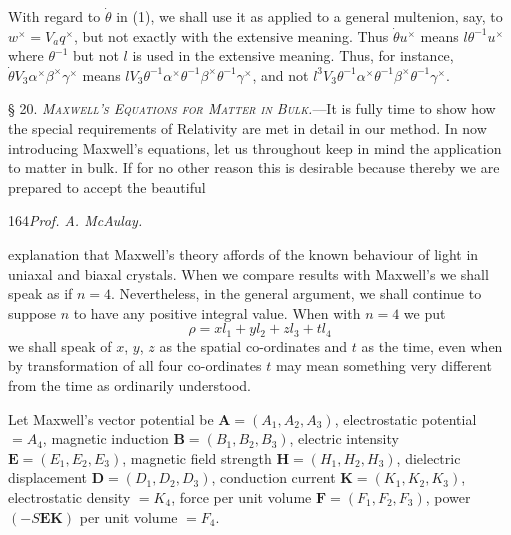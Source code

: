 \documentclass[11pt]{article}
\begin{document}
\indent With regard to $\dot\theta$ in (1), we shall use it as applied to a general multenion, say, to $w^\times=V_aq^\times$, but not exactly with the extensive meaning. Thus $\dot\theta u^\times$ means $l\theta^{-1}u^\times$ where $\theta^{-1}$ but not $l$ is used in the extensive meaning. Thus, for instance, $\dot\theta V_3\alpha^\times\beta^\times\gamma^\times$ means {\small$lV_3\theta^{-1}\alpha^\times\theta^{-1}\beta^\times\theta^{-1}\gamma^\times$}, and not {\small$l^3V_3\theta^{-1}\alpha^\times\theta^{-1}\beta^\times\theta^{-1}\gamma^\times$}.

\noindent\textsc{§ 20. \emph{Maxwell's Equations for Matter in Bulk.}}---It is fully time to show how the special requirements of Relativity are met in detail in our method. In now introducing Maxwell's equations, let us throughout keep in mind the application to matter in bulk. If for no other reason this is desirable because thereby we are prepared to accept the beautiful

\newpage\thispagestyle{empty}\begin{center}164\hfill \textit{Prof. A. McAulay.}\end{center}
explanation that Maxwell's theory affords of the known behaviour of light in uniaxal and biaxal crystals. When we compare results with Maxwell's we shall speak as if $n=4$. Nevertheless, in the general argument, we shall continue to suppose $n$ to have any positive integral value. When with $n=4$ we put
\[
  \rho=xl_1+yl_2+zl_3+tl_4
\]
we shall speak of $x$, $y$, $z$ as the spatial co-ordinates and $t$ as the time, even when by transformation of all four co-ordinates $t$ may mean something very different from the time as ordinarily understood.

\indent Let Maxwell's vector potential be $\mathbf{A}=(A_1,A_2,A_3)$, electrostatic potential $=A_4$, magnetic induction $\mathbf{B}=(B_1,B_2,B_3)$, electric intensity $\mathbf{E}=(E_1,E_2,E_3)$, magnetic field strength $\mathbf{H}=(H_1,H_2,H_3)$, dielectric displacement $\mathbf{D}=(D_1,D_2,D_3)$, conduction current $\mathbf{K}=(K_1,K_2,K_3)$, electrostatic density $=K_4$, force per unit volume $\mathbf{F}=(F_1,F_2,F_3)$, power $(-S\mathbf{E}\mathbf{K})$ per unit volume $=F_4$.
\end{document}
